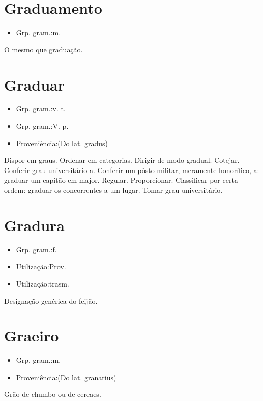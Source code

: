 \section{Graduamento}
\begin{itemize}
\item {Grp. gram.:m.}
\end{itemize}
O mesmo que \textunderscore graduação\textunderscore .
\section{Graduar}
\begin{itemize}
\item {Grp. gram.:v. t.}
\end{itemize}
\begin{itemize}
\item {Grp. gram.:V. p.}
\end{itemize}
\begin{itemize}
\item {Proveniência:(Do lat. \textunderscore gradus\textunderscore )}
\end{itemize}
Dispor em graus.
Ordenar em categorias.
Dirigir de modo gradual.
Cotejar.
Conferir grau universitário a.
Conferir um pôsto militar, meramente honorífico, a: \textunderscore graduar um capitão em major\textunderscore .
Regular.
Proporcionar.
Classificar por certa ordem: \textunderscore graduar os concorrentes a um lugar\textunderscore .
Tomar grau universitário.
\section{Gradura}
\begin{itemize}
\item {Grp. gram.:f.}
\end{itemize}
\begin{itemize}
\item {Utilização:Prov.}
\end{itemize}
\begin{itemize}
\item {Utilização:trasm.}
\end{itemize}
Designação genérica do feijão.
\section{Graeiro}
\begin{itemize}
\item {Grp. gram.:m.}
\end{itemize}
\begin{itemize}
\item {Proveniência:(Do lat. \textunderscore granarius\textunderscore )}
\end{itemize}
Grão de chumbo ou de cereaes.
